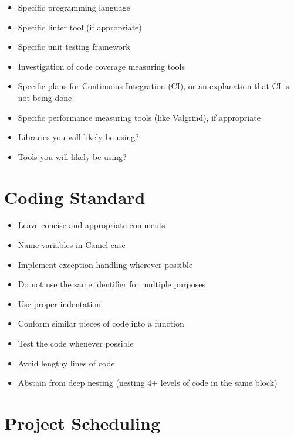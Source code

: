 \documentclass{article}
\begin{document}
\begin{itemize}
\item Specific programming language
\item Specific linter tool (if appropriate)
\item Specific unit testing framework
\item Investigation of code coverage measuring tools
\item Specific plans for Continuous Integration (CI), or an explanation that CI
  is not being done
\item Specific performance measuring tools (like Valgrind), if
  appropriate
\item Libraries you will likely be using?
\item Tools you will likely be using?
\end{itemize}

\section{Coding Standard}
\begin{itemize}
	\item Leave concise and appropriate comments
	\item Name variables in Camel case
	\item Implement exception handling wherever possible
	\item Do not use the same identifier for multiple purposes
	\item Use proper indentation
	\item Conform similar pieces of code into a function
	\item Test the code whenever possible
	\item Avoid lengthy lines of code
	\item Abstain from deep nesting (nesting 4+ levels of code in the same block)
\end{itemize}
\section{Project Scheduling}
\end{document}
